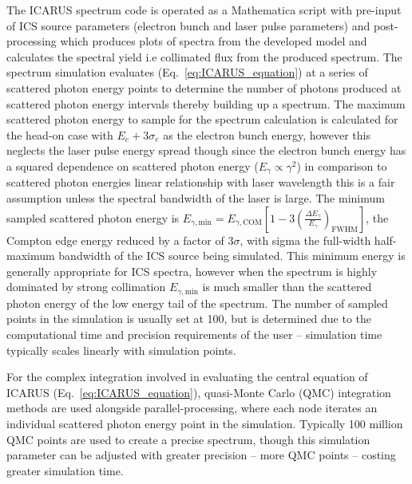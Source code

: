 \documentclass[../main.tex]{subfiles}
\begin{document}
The \textsc{ICARUS} spectrum code is operated as a Mathematica script with pre-input of ICS source parameters (electron bunch and laser pulse parameters) and post-processing which produces plots of spectra from the developed model and calculates the spectral yield i.e collimated flux from the produced spectrum. The spectrum simulation evaluates (Eq.~\ref{eq:ICARUS_equation}) at a series of scattered photon energy points to determine the number of photons produced at scattered photon energy intervals thereby building up a spectrum. The maximum scattered photon energy to sample for the spectrum calculation is calculated for the head-on case with $E_{e}+3\sigma_{e}$ as the electron bunch energy, however this neglects the laser pulse energy spread though since the electron bunch energy has a squared dependence on scattered photon energy ($E_{\gamma}\propto\gamma^{2}$) in comparison to scattered photon energies linear relationship with laser wavelength this is a fair assumption unless the spectral bandwidth of the laser is large. The minimum sampled scattered photon energy is $E_{\gamma,\mathrm{min}} = E_{\gamma,\mathrm{COM}}\left[1-3\left(\frac{\Delta E_{\gamma}}{E_{\gamma}}\right)_{\mathrm{FWHM}}\right]$, the Compton edge energy reduced by a factor of $3\sigma$, with sigma the full-width half-maximum bandwidth of the ICS source being simulated. This minimum energy is generally appropriate for ICS spectra, however when the spectrum is highly dominated by strong collimation $E_{\gamma,\mathrm{min}}$ is much smaller than the scattered photon energy of the low energy tail of the spectrum. The number of sampled points in the simulation is usually set at 100, but is determined due to the computational time and precision requirements of the user -- simulation time typically scales linearly with simulation points.  

For the complex integration involved in evaluating the central equation of \textsc{ICARUS} (Eq.~\ref{eq:ICARUS_equation}), quasi-Monte Carlo (QMC) integration methods are used alongside parallel-processing, where each node iterates an individual scattered photon energy point in the simulation. Typically 100 million QMC points are used to create a precise spectrum, though this simulation parameter can be adjusted with greater precision -- more QMC points -- costing greater simulation time.
\end{document}
